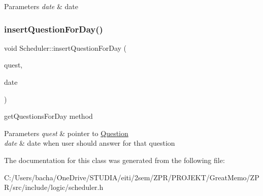 \begin{DoxyParams}{Parameters}
{\em date} & date \\
\hline
\end{DoxyParams}
\mbox{\label{class_scheduler_a8437191585dee71d765d3fcdc9f4af72}} 
\subsubsection{\texorpdfstring{insert\+Question\+For\+Day()}{insertQuestionForDay()}}
{\footnotesize\ttfamily void Scheduler\+::insert\+Question\+For\+Day (\begin{DoxyParamCaption}\item[{std\+::shared\+\_\+ptr$<$ \hyperlink{class_question}{Question} $>$}]{quest,  }\item[{Q\+Date}]{date }\end{DoxyParamCaption})\hspace{0.3cm}{\ttfamily [inline]}}



get\+Questions\+For\+Day method 


\begin{DoxyParams}{Parameters}
{\em quest} & pointer to \hyperlink{class_question}{Question} \\
\hline
{\em date} & date when user should answer for that question \\
\hline
\end{DoxyParams}


The documentation for this class was generated from the following file\+:\begin{DoxyCompactItemize}
\item 
C\+:/\+Users/bacha/\+One\+Drive/\+S\+T\+U\+D\+I\+A/eiti/2sem/\+Z\+P\+R/\+P\+R\+O\+J\+E\+K\+T/\+Great\+Memo/\+Z\+P\+R/src/include/logic/scheduler.\+h\end{DoxyCompactItemize}
